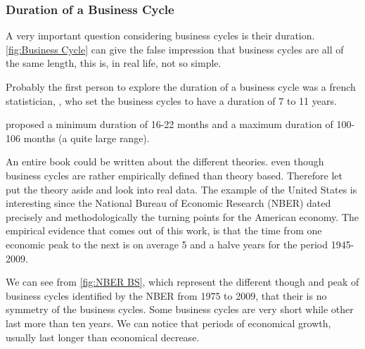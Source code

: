 \documentclass[12pt,a4paper,oneside]{book}
\begin{document}
\subsubsection{Duration of a Business Cycle}

A very important question considering business cycles is their duration.
\autoref{fig:Business Cycle} can give the false impression that business cycles are all of the same length, this is, in real life, not so simple.

Probably the first person to explore the duration of a business cycle was a french statistician,  \cite{juglar_crises_1862}, who set the business cycles to have a duration of 7 to 11 years.

\cite{mitchell_measuring_1946} proposed a minimum duration of 16-22 months and a maximum duration of 100-106 months (a quite large range). 

An entire book could be written about the different theories. even though business cycles are rather empirically defined than theory based.  
Therefore let put the theory aside and look into real data.
The example of the United States is interesting since the National Bureau of Economic Research (NBER) dated precisely and methodologically the turning points for the American economy. The empirical evidence that comes out of this work, is that the time from one economic peak to the next is on average 5 and a halve years for the period 1945-2009.

We can see from \autoref{fig:NBER BS}, which represent the different though and peak of business cycles identified by the NBER from 1975 to 2009, that their is no symmetry of the business cycles. Some business cycles are very short while other last more than ten years.
We can notice that periods of economical growth, usually last longer than economical decrease.
\end{document}
